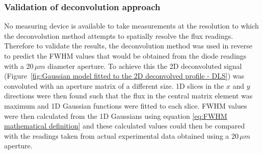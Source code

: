 \subsubsection{Validation of deconvolution approach}
\label{subs:Validation of deconvolution approach}
No measuring device is available to take measurements at the resolution to which the deconvolution method attempts to spatially resolve the flux readings.
Therefore to validate the results, the deconvolution method was used in reverse to predict the FWHM values that would be obtained from the diode readings with a 20$\,\mu m$ diameter aperture.
To achieve this the 2D deconvoluted signal (Figure~\ref{fig:Gaussian model fitted to the 2D deconvolved profile - DLS}) was convoluted with an aperture matrix of a different size.
1D slices in the $x$ and $y$ directions were then found such that the flux in the central matrix element was maximum and 1D Gaussian functions were fitted to each slice.
FWHM values were then calculated from the 1D Gaussians using equation \ref{eq:FWHM mathematical definition} and these calculated values could then be compared with the readings taken from actual experimental data obtained using a 20$\,\mu m$ aperture.

